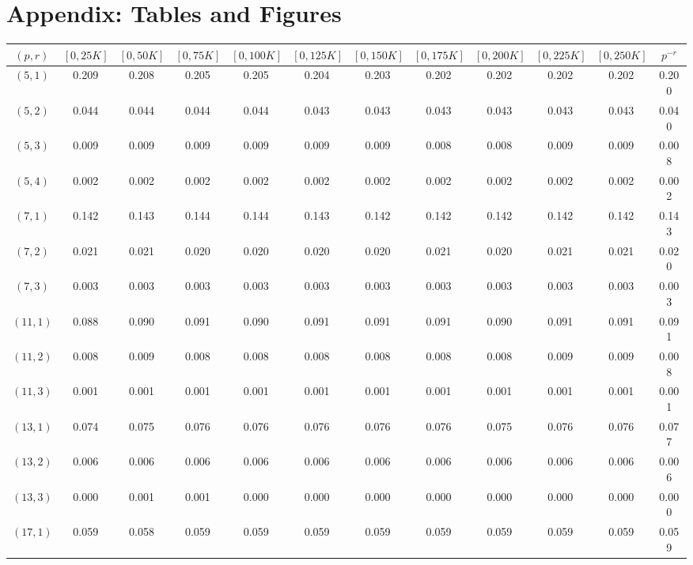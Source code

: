 \documentclass[12pt]{amsart}%
\newcommand{\1}{\mathds{1}}
\theoremstyle{definition}
\numberwithin{equation}{section}
\numberwithin{table}{section}
\numberwithin{figure}{section}
\begin{document}
\clearpage
\section{Appendix: Tables and Figures}
\label{sec:appendix}


\begin{table}[htbp]
\centering
\scriptsize
\begin{tabular}{@{}c|cccccccccc||c@{}}
$(p,r)$ & $[0,25K]$ & $[0,50K]$ & $[0,75K]$ & $[0,100K]$ & $[0,125K]$ & $[0,150K]$ & $[0,175K]$ & $[0,200K]$ & $[0,225K]$ & $[0,250K]$ & $p^{-r}$ \\
\hline
$(5,1)$ & 0.209 & 0.208 & 0.205 & 0.205 & 0.204 & 0.203 & 0.202 & 0.202 & 0.202 & 0.202 & 0.200 \\
$(5,2)$ & 0.044 & 0.044 & 0.044 & 0.044 & 0.043 & 0.043 & 0.043 & 0.043 & 0.043 & 0.043 & 0.040 \\
$(5,3)$ & 0.009 & 0.009 & 0.009 & 0.009 & 0.009 & 0.009 & 0.008 & 0.008 & 0.009 & 0.009 & 0.008 \\
$(5,4)$ & 0.002 & 0.002 & 0.002 & 0.002 & 0.002 & 0.002 & 0.002 & 0.002 & 0.002 & 0.002 & 0.002 \\
\hline\hline
$(7,1)$ & 0.142 & 0.143 & 0.144 & 0.144 & 0.143 & 0.142 & 0.142 & 0.142 & 0.142 & 0.142 & 0.143 \\
$(7,2)$ & 0.021 & 0.021 & 0.020 & 0.020 & 0.020 & 0.020 & 0.021 & 0.020 & 0.021 & 0.021 & 0.020 \\
$(7,3)$ & 0.003 & 0.003 & 0.003 & 0.003 & 0.003 & 0.003 & 0.003 & 0.003 & 0.003 & 0.003 & 0.003 \\
\hline\hline
$(11,1)$ & 0.088 & 0.090 & 0.091 & 0.090 & 0.091 & 0.091 & 0.091 & 0.090 & 0.091 & 0.091 & 0.091 \\
$(11,2)$ & 0.008 & 0.009 & 0.008 & 0.008 & 0.008 & 0.008 & 0.008 & 0.008 & 0.009 & 0.009 & 0.008 \\
$(11,3)$ & 0.001 & 0.001 & 0.001 & 0.001 & 0.001 & 0.001 & 0.001 & 0.001 & 0.001 & 0.001 & 0.001 \\
\hline\hline
$(13,1)$ & 0.074 & 0.075 & 0.076 & 0.076 & 0.076 & 0.076 & 0.076 & 0.075 & 0.076 & 0.076 & 0.077 \\
$(13,2)$ & 0.006 & 0.006 & 0.006 & 0.006 & 0.006 & 0.006 & 0.006 & 0.006 & 0.006 & 0.006 & 0.006 \\
$(13,3)$ & 0.000 & 0.001 & 0.001 & 0.000 & 0.000 & 0.000 & 0.000 & 0.000 & 0.000 & 0.000 & 0.000 \\
\hline\hline
$(17,1)$ & 0.059 & 0.058 & 0.059 & 0.059 & 0.059 & 0.059 & 0.059 & 0.059 & 0.059 & 0.059 & 0.059 \\

\end{tabular}
\end{table}
\end{document}
